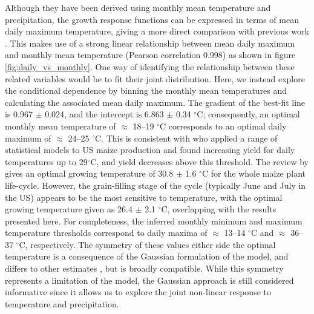 \documentclass[12pt]{iopart}
\newcommand{\remove}[1]{}
\newcommand{\add}[1]{#1}
\begin{document}
Although they have been derived using monthly mean temperature and precipitation, the growth response functions can be expressed in terms of mean daily maximum temperature, giving a more direct comparison with previous work \citep[e.g.][]{schlenker:2009, hatfield:2011, sanchez:2014, hatfield:2015}. This makes use of a strong linear relationship between mean daily maximum and monthly mean temperature (Pearson correlation 0.998) as shown in figure \ref{fig:daily_vs_monthly}. \remove{The points in the background show each measurement of daily maximum and monthly mean temperature.} One way of identifying the relationship between these related variables would be to fit their joint distribution. Here, we instead explore the conditional dependence by binning the monthly mean temperatures and calculating the associated mean daily maximum. The gradient of the best-fit line is 0.967 $\pm$ 0.024, and the intercept is 6.863 $\pm$ 0.34 $^\circ$C; consequently, an optimal monthly mean temperature of $\approx$ 18--19 $^\circ$C corresponds to an optimal daily maximum of $\approx$ 24--25 $^\circ$C. This is consistent with \cite{schlenker:2009} who applied a range of statistical models to US maize production and found increasing yield for daily temperatures up to 29$^\circ$C, and yield decreases above this threshold. The review by \cite{sanchez:2014} gives an optimal growing temperature of 30.8 $\pm$ 1.6 $^\circ$C for the whole maize plant life-cycle. However, the grain-filling stage of the cycle (typically June and July in the US) appears to be the most sensitive to temperature, with the optimal growing temperature given as 26.4 $\pm$ 2.1 $^\circ$C, overlapping with the results presented here. \add{For completeness, the inferred monthly minimum and maximum temperature thresholds correspond to daily maxima of $\approx$ 13--14 $^\circ$C and $\approx$ 36--37 $^\circ$C, respectively. The symmetry of these values either side the optimal temperature is a consequence of the Gaussian formulation of the model, and differs to other estimates \citep[e.g.][and references therein]{zhou:2018}, but is broadly compatible. While this symmetry represents a limitation of the model, the Gaussian approach is still considered informative since it allows us to explore the joint non-linear response to temperature and precipitation.}
\end{document}
